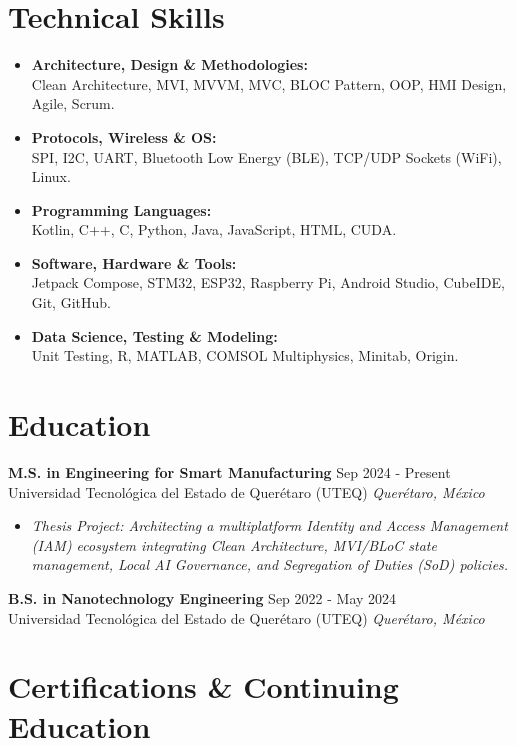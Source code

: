 \documentclass[10pt,a4paper]{article}
\newcommand{\eduexp}[4]{
    \textbf{#1} \hfill #2\\
    \textcolor{primary}{#3} \hfill \textit{#4}\vspace{5pt}
    \vspace{4pt}
}
\begin{document}
\section*{Technical Skills}
\begin{itemize}[leftmargin=*]
    \item \textbf{Architecture, Design \& Methodologies:}\\
    Clean Architecture, MVI, MVVM, MVC, BLOC Pattern, OOP, HMI Design, Agile, Scrum.
    \item \textbf{Protocols, Wireless \& OS:}\\ 
    SPI, I2C, UART, Bluetooth Low Energy (BLE), TCP/UDP Sockets (WiFi), Linux.
    \item \textbf{Programming Languages:}\\ 
    Kotlin, C++, C, Python, Java, JavaScript, HTML, CUDA.
    \item \textbf{Software, Hardware \& Tools:}\\ 
    Jetpack Compose, STM32, ESP32, Raspberry Pi, Android Studio, CubeIDE, Git, GitHub.
    \item \textbf{Data Science, Testing \& Modeling:}\\ 
    Unit Testing, R, MATLAB, COMSOL Multiphysics, Minitab, Origin.
\end{itemize}

\section*{Education}
\eduexp{M.S. in Engineering for Smart Manufacturing}{Sep 2024 - Present}{Universidad Tecnológica del Estado de Querétaro (UTEQ)}{Querétaro, México}
\begin{itemize}[leftmargin=*,nosep]
    \item \textit{Thesis Project: Architecting a multiplatform Identity and Access Management (IAM) ecosystem integrating Clean Architecture, MVI/BLoC state management, Local AI Governance, and Segregation of Duties (SoD) policies.}
\end{itemize}
\vspace{4pt}

\eduexp{B.S. in Nanotechnology Engineering}{Sep 2022 - May 2024}{Universidad Tecnológica del Estado de Querétaro (UTEQ)}{Querétaro, México}

\section*{Certifications \& Continuing Education}
\end{document}
